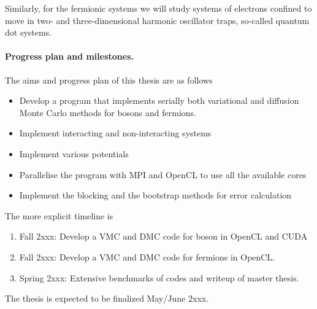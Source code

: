 \documentclass[%
oneside,                 %
final,                   %
10pt]{article}
\begin{document}
Similarly, for the fermionic systems we will study systems of electrons confined to move in two- and three-dimensional harmonic oscillator traps, so-called quantum dot systems.


\paragraph{Progress plan and milestones.}
The aims and progress plan of this thesis are as follows

\begin{itemize}
\item Develop a program that implements serially both variational and diffusion Monte Carlo methods for bosons and fermions.

\item Implement interacting and non-interacting systems

\item Implement various potentials

\item Parallelise the program with MPI and OpenCL to use all the available cores

\item Implement the blocking and the bootstrap methods  for error calculation
\end{itemize}

\noindent
The more explicit timeline is 

\begin{enumerate}
 \item Fall 2xxx: Develop a VMC and DMC code for boson in OpenCL and CUDA

 \item Fall 2xxx: Develop a VMC and DMC  code for fermions in OpenCL.

 \item Spring 2xxx: Extensive benchmarks of codes and writeup of master thesis.
\end{enumerate}

\noindent
The thesis is expected to be finalized May/June 2xxx.
















\end{document}
